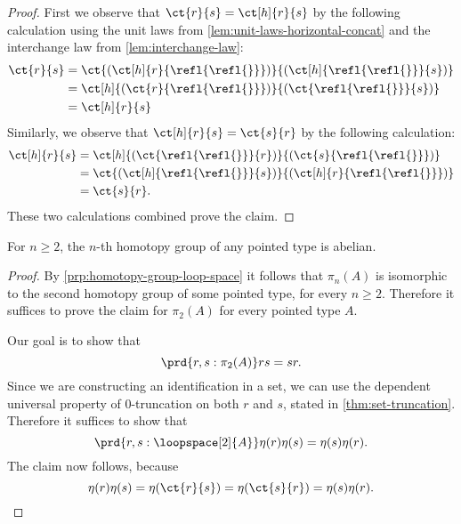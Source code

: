 \begin{proof}
  First we observe that $\ct{r}{s}=\ct[h]{r}{s}$ by the following calculation using the unit laws from \cref{lem:unit-laws-horizontal-concat} and the interchange law from \cref{lem:interchange-law}:
  \begin{align*}
    \ct{r}{s} & = \ct{(\ct[h]{r}{\refl{\refl{}}})}{(\ct[h]{\refl{\refl{}}}{s})} \\
              & = \ct[h]{(\ct{r}{\refl{\refl{}}})}{(\ct{\refl{\refl{}}}{s})} \\
              & = \ct[h]{r}{s}
  \end{align*}
  Similarly, we observe that $\ct[h]{r}{s}=\ct{s}{r}$ by the following calculation:
  \begin{align*}
    \ct[h]{r}{s} & = \ct[h]{(\ct{\refl{\refl{}}}{r})}{(\ct{s}{\refl{\refl{}}})} \\
                 & = \ct{(\ct[h]{\refl{\refl{}}}{s})}{(\ct[h]{r}{\refl{\refl{}}})} \\
                 & = \ct{s}{r}.
  \end{align*}
  These two calculations combined prove the claim.
\end{proof}

\begin{cor}
For $n\geq 2$, the $n$-th homotopy group of any pointed type is abelian.
\end{cor}

\begin{proof}
  By \cref{prp:homotopy-group-loop-space} it follows that $\pi_n(A)$ is isomorphic to the second homotopy group of some pointed type, for every $n\geq 2$. Therefore it suffices to prove the claim for $\pi_2(A)$ for every pointed type $A$.
  
  Our goal is to show that 
  \begin{equation*}
    \prd{r,s:\pi_2(A)} rs=sr.
  \end{equation*}
  Since we are constructing an identification in a set, we can use the dependent universal property of $0$-truncation on both $r$ and $s$, stated in \cref{thm:set-truncation}. Therefore it suffices to show that
  \begin{equation*}
    \prd{r,s:\loopspace[2]{A}} \eta(r)\eta(s)=\eta(s)\eta(r).
  \end{equation*}
  The claim now follows, because
  \begin{equation*}
    \eta(r)\eta(s)=\eta(\ct{r}{s})=\eta(\ct{s}{r})=\eta(s)\eta(r).\qedhere
  \end{equation*}
\end{proof}

